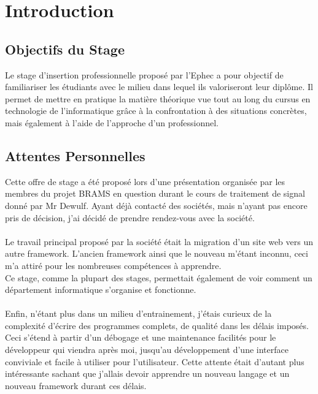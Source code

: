 \documentclass[11pt]{article}
\begin{document}
\newpage

\section{Introduction}

\subsection{Objectifs du Stage}
Le stage d'insertion professionnelle proposé par l'Ephec a pour objectif de familiariser les étudiants avec le milieu dans lequel ils valoriseront leur diplôme.
Il permet de mettre en pratique la matière théorique vue tout au long du cursus en technologie de l'informatique grâce à la confrontation à des situations concrètes, mais également à l'aide de l'approche d'un professionnel.

\subsection{Attentes Personnelles}
Cette offre de stage a été proposé lors d'une présentation organisée par les membres du projet BRAMS en question durant le cours de traitement de signal donné par Mr Dewulf.
Ayant déjà contacté des sociétés, mais n'ayant pas encore pris de décision, j'ai décidé de prendre rendez-vous avec la société.\\
\\
Le travail principal proposé par la société était la migration d'un site web vers un autre framework.
L'ancien framework ainsi que le nouveau m'étant inconnu, ceci m'a attiré pour les nombreuses compétences à apprendre.\\
Ce stage, comme la plupart des stages, permettait également de voir comment un département informatique s'organise et fonctionne.\\
\\
Enfin, n'étant plus dans un milieu d'entrainement, j'étais curieux de la complexité d'écrire des programmes complets, de qualité dans les délais imposés.
Ceci s'étend à partir d'un débogage et une maintenance facilités pour le développeur qui viendra après moi, jusqu'au développement d'une interface conviviale et facile à utiliser pour l'utilisateur.
Cette attente était d'autant plus intéressante sachant que j'allais devoir apprendre un nouveau langage et un nouveau framework durant ces délais.

\newpage
\end{document}
